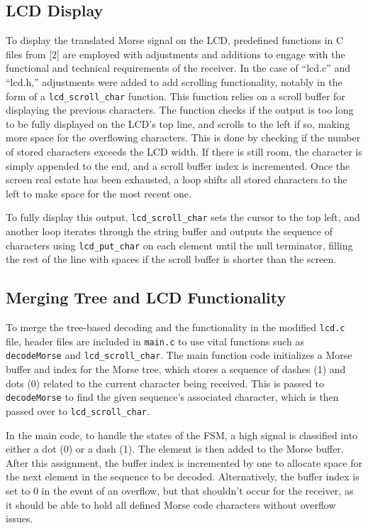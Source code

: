 \documentclass[head=13.6pt]{cce2014-design}
\begin{document}
\subsection{LCD Display}
To display the translated Morse signal on the LCD, predefined functions in C files from [2] are employed with adjustments and additions to engage with the functional and technical requirements of the receiver. In the case of ``lcd.c'' and ``lcd.h,'' adjustments were added to add scrolling functionality, notably in the form of a \texttt{lcd\_scroll\_char} function. This function relies on a scroll buffer for displaying the previous characters. The function checks if the output is too long to be fully displayed on the LCD’s top line, and scrolls to the left if so, making more space for the overflowing characters. This is done by checking if the number of stored characters exceeds the LCD width. If there is still room, the character is simply appended to the end, and a scroll buffer index is incremented. Once the screen real estate has been exhausted, a loop shifts all stored characters to the left to make space for the most recent one.

To fully display this output, \texttt{lcd\_scroll\_char} sets the cursor to the top left, and another loop iterates through the string buffer and outputs the sequence of characters using \texttt{lcd\_put\_char} on each element until the null terminator, filling the rest of the line with spaces if the scroll buffer is shorter than the screen.

\subsection{Merging Tree and LCD Functionality}
To merge the tree-based decoding and the functionality in the modified \texttt{lcd.c} file, header files are included in \texttt{main.c} to use vital functions such as \texttt{decodeMorse} and \texttt{lcd\_scroll\_char}. The main function code initializes a Morse buffer and index for the Morse tree, which stores a sequence of dashes (1) and dots (0) related to the current character being received. This is passed to \texttt{decodeMorse} to find the given sequence’s associated character, which is then passed over to \texttt{lcd\_scroll\_char}.

In the main code, to handle the states of the FSM, a high signal is classified into either a dot (0) or a dash (1). The element is then added to the Morse buffer. After this assignment, the buffer index is incremented by one to allocate space for the next element in the sequence to be decoded. Alternatively, the buffer index is set to 0 in the event of an overflow, but that shouldn’t occur for the receiver, as it should be able to hold all defined Morse code characters without overflow issues.
\end{document}
